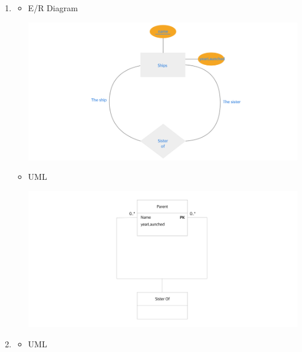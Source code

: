 \documentclass[12pt]{article}
\begin{document}
\begin{enumerate}[1.]
\begin{itemize}
    \end{itemize}

    \item

    \begin{itemize}
        \item E/R Diagram

        \begin{center}
        \includegraphics[width=\linewidth]{images/worksheet_15_solution_21.png}
        \end{center}

        \item UML

        \begin{center}
        \includegraphics[width=\linewidth]{images/worksheet_15_solution_22.png}
        \end{center}

    \end{itemize}

    \item

    \begin{itemize}

        \item UML


\end{itemize}
\end{enumerate}
\end{document}
